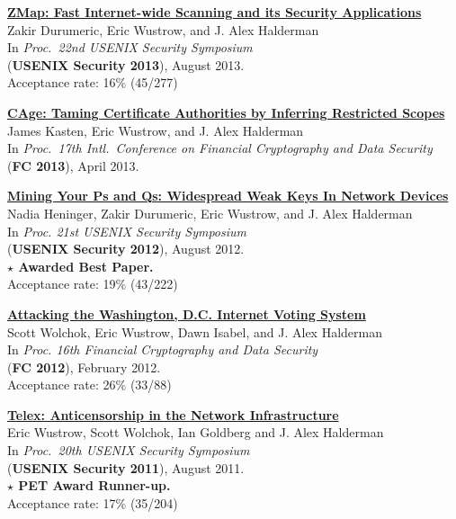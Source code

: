\documentclass[margin,11pt]{res} %
\begin{document}
    \textbf{\href{https://zmap.io/paper.html}{ZMap: Fast Internet-wide Scanning and its Security Applications}} \\
    Zakir Durumeric, Eric Wustrow, and J. Alex Halderman \\
    In \emph{Proc.\ 22nd USENIX Security Symposium} \\
    (\textbf{USENIX Security 2013}), August 2013. \\
    Acceptance rate: 16\% (45/277)


    \textbf{\href{https://jhalderm.com/pub/papers/cage-fc13.pdf}{CAge: Taming Certificate Authorities by Inferring Restricted Scopes}} \\
    James Kasten, Eric Wustrow, and J. Alex Halderman \\
    In \emph{Proc.\ 17th Intl.\ Conference on Financial Cryptography and Data Security} \\
    (\textbf{FC 2013}), April 2013.

    \textbf{\href{https://factorable.net/weakkeys12.conference.pdf}{Mining Your Ps and Qs: Widespread Weak Keys In Network Devices}} \\
    Nadia Heninger, Zakir Durumeric, Eric Wustrow, and J. Alex Halderman \\
    In \emph{Proc. 21st USENIX Security Symposium} \\
    (\textbf{USENIX Security 2012}), August 2012. \\
    \textbf{$\star$ Awarded Best Paper.} \\
    Acceptance rate: 19\% (43/222)

    \textbf{\href{https://ericw.us/trow/dc-internet-voting-fc.pdf}{Attacking the Washington, D.C. Internet Voting System}} \\
    Scott Wolchok, Eric Wustrow, Dawn Isabel, and J. Alex Halderman \\
    In \emph{Proc. 16th Financial Cryptography and Data Security} \\
    (\textbf{FC 2012}), February 2012. \\
    Acceptance rate: 26\% (33/88)

    \textbf{\href{https://telex.cc/pub/telex-usenixsec11.pdf}{Telex: Anticensorship in the Network Infrastructure}} \\
    Eric Wustrow, Scott Wolchok, Ian Goldberg and J. Alex Halderman \\
    In \emph{Proc.\ 20th USENIX Security Symposium} \\
    (\textbf{USENIX Security 2011}), August 2011. \\
        \textbf{$\star$ PET Award Runner-up.} \\
    Acceptance rate: 17\% (35/204)
\end{document}
